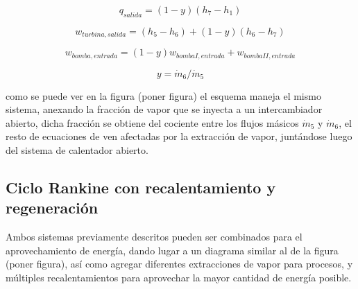 \begin{equation}
    q_{salida}=(1-y)(h_{7}-h_{1})
\end{equation}

\begin{equation}
    w_{turbina,salida}=(h_{5}-h_{6})+(1-y)(h_{6}-h_{7})
\end{equation}

\begin{equation}
    w_{bomba,entrada}=(1-y)w_{bomba I, entrada}+w_{bomba II, entrada}
\end{equation}

\begin{equation}
    y=\dot{m}_{6}/\dot{m}_{5}
\end{equation}

como se puede ver en la figura (poner figura) el esquema maneja el mismo sistema, anexando la fracción de vapor que se inyecta a un intercambiador abierto, dicha fracción se obtiene del cociente entre los flujos másicos $\dot{m}_{5} $ y $\dot{m}_6 $, el resto de ecuaciones de ven afectadas por la extracción de vapor, juntándose luego del sistema de calentador abierto.



\subsection{Ciclo Rankine con recalentamiento y regeneración}

Ambos sistemas previamente descritos pueden ser combinados para el aprovechamiento de energía, dando lugar a un diagrama similar al de la figura (poner figura), así como agregar diferentes extracciones de vapor para procesos, y múltiples recalentamientos para aprovechar la mayor cantidad de energía posible.





